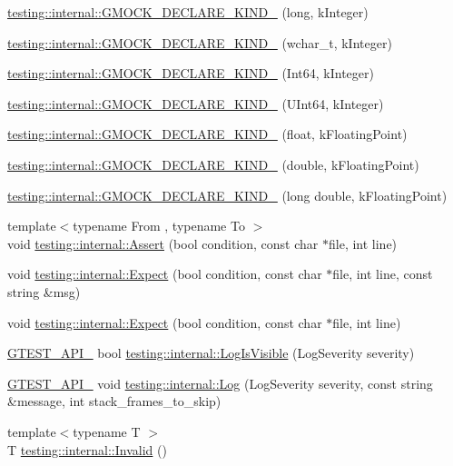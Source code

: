\begin{DoxyCompactItemize}
\hyperlink{namespacetesting_1_1internal_a40597f856b3d94dc82e9fbbf9b027819}{testing\+::internal\+::\+G\+M\+O\+C\+K\+\_\+\+D\+E\+C\+L\+A\+R\+E\+\_\+\+K\+I\+N\+D\+\_\+} (long, k\+Integer)
\item 
\hyperlink{namespacetesting_1_1internal_af00aa2679c10ed170064e5ec5dd80e29}{testing\+::internal\+::\+G\+M\+O\+C\+K\+\_\+\+D\+E\+C\+L\+A\+R\+E\+\_\+\+K\+I\+N\+D\+\_\+} (wchar\+\_\+t, k\+Integer)
\item 
\hyperlink{namespacetesting_1_1internal_ae1d4cd9aef9a240d257364691ed3679e}{testing\+::internal\+::\+G\+M\+O\+C\+K\+\_\+\+D\+E\+C\+L\+A\+R\+E\+\_\+\+K\+I\+N\+D\+\_\+} (Int64, k\+Integer)
\item 
\hyperlink{namespacetesting_1_1internal_ae09394c3d07a5d99308fc3bbc9edc877}{testing\+::internal\+::\+G\+M\+O\+C\+K\+\_\+\+D\+E\+C\+L\+A\+R\+E\+\_\+\+K\+I\+N\+D\+\_\+} (U\+Int64, k\+Integer)
\item 
\hyperlink{namespacetesting_1_1internal_ad4ebf1b53b79ac38fbd18ccf4d63ceca}{testing\+::internal\+::\+G\+M\+O\+C\+K\+\_\+\+D\+E\+C\+L\+A\+R\+E\+\_\+\+K\+I\+N\+D\+\_\+} (float, k\+Floating\+Point)
\item 
\hyperlink{namespacetesting_1_1internal_a45748f4c08b868cb4939081769cdc7b1}{testing\+::internal\+::\+G\+M\+O\+C\+K\+\_\+\+D\+E\+C\+L\+A\+R\+E\+\_\+\+K\+I\+N\+D\+\_\+} (double, k\+Floating\+Point)
\item 
\hyperlink{namespacetesting_1_1internal_af46fdd94d8aea0da729b554de443315f}{testing\+::internal\+::\+G\+M\+O\+C\+K\+\_\+\+D\+E\+C\+L\+A\+R\+E\+\_\+\+K\+I\+N\+D\+\_\+} (long double, k\+Floating\+Point)
\item 
{\footnotesize template$<$typename From , typename To $>$ }\\void \hyperlink{namespacetesting_1_1internal_a7a259643b7f2d23ce2b757728df42c99}{testing\+::internal\+::\+Assert} (bool condition, const char $\ast$file, int line)
\item 
void \hyperlink{namespacetesting_1_1internal_ab3000fc56be000e4fa6ed7cdcfee3106}{testing\+::internal\+::\+Expect} (bool condition, const char $\ast$file, int line, const string \&msg)
\item 
void \hyperlink{namespacetesting_1_1internal_a0dfe8a755bd02aa5ea162764b61a9d97}{testing\+::internal\+::\+Expect} (bool condition, const char $\ast$file, int line)
\item 
\hyperlink{gtest-port_8h_aa73be6f0ba4a7456180a94904ce17790}{G\+T\+E\+S\+T\+\_\+\+A\+P\+I\+\_\+} bool \hyperlink{namespacetesting_1_1internal_a69ffdba5ee36743e88d8f89b79e566ff}{testing\+::internal\+::\+Log\+Is\+Visible} (Log\+Severity severity)
\item 
\hyperlink{gtest-port_8h_aa73be6f0ba4a7456180a94904ce17790}{G\+T\+E\+S\+T\+\_\+\+A\+P\+I\+\_\+} void \hyperlink{namespacetesting_1_1internal_ac0bc151763a8187d74387c4b2ba685c9}{testing\+::internal\+::\+Log} (Log\+Severity severity, const string \&message, int stack\+\_\+frames\+\_\+to\+\_\+skip)
\item 
{\footnotesize template$<$typename T $>$ }\\T \hyperlink{namespacetesting_1_1internal_a3316c24e8a79f5def3e85d763ae50854}{testing\+::internal\+::\+Invalid} ()
\end{DoxyCompactItemize}
